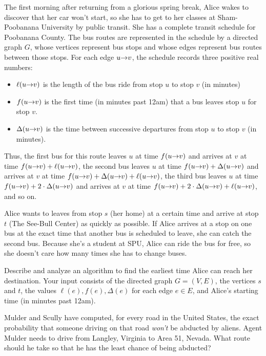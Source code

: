 \begin{exercises}
\item The first morning after returning from a glorious spring break, Alice wakes to discover that her car won’t start, so she has to get to her classes at Sham-Poobanana University by public transit.
She has a complete transit schedule for Poobanana County.
The bus routes are represented in the schedule by a directed graph $G$, whose vertices represent bus stops and whose edges represent bus routes between those stops.
For each edge $u\mathord{\rightarrow}v$, the schedule records three positive real numbers:
\begin{itemize}
\item $\ell(u\mathord{\rightarrow}v)$ is the length of the bus ride from stop $u$ to stop $v$ (in minutes)
\item $f(u\mathord{\rightarrow}v)$ is the first time (in minutes past 12am) that a bus leaves stop $u$ for stop $v$.
\item $\Delta(u\mathord{\rightarrow}v)$ is the time between successive departures from stop $u$ to stop $v$ (in minutes).
\end{itemize}
Thus, the first bus for this route leaves $u$ at time $f(u\mathord{\rightarrow}v)$ and arrives at $v$ at time $f(u\mathord{\rightarrow}v) + \ell(u\mathord{\rightarrow}v)$, the second bus leaves $u$ at time $f(u\mathord{\rightarrow}v) + \Delta(u\mathord{\rightarrow}v)$ and arrives at $v$ at time $f(u\mathord{\rightarrow}v) + \Delta(u\mathord{\rightarrow}v) + \ell(u\mathord{\rightarrow}v)$, the third bus leaves $u$ at time $f(u\mathord{\rightarrow}v) + 2 \cdot \Delta(u\mathord{\rightarrow}v)$ and arrives at $v$ at time $f(u\mathord{\rightarrow}v) + 2 \cdot \Delta(u\mathord{\rightarrow}v) + \ell(u\mathord{\rightarrow}v)$, and so on.

Alice wants to leaves from stop $s$ (her home) at a certain time and arrive at stop $t$ (The See-Bull Center) as quickly as possible.
If Alice arrives at a stop on one bus at the exact time that another bus is scheduled to leave, she can catch the second bus.
Because she’s a student at SPU, Alice can ride the bus for free, so she doesn’t care how many times she has to change buses.

Describe and analyze an algorithm to find the earliest time Alice can reach her destination.
Your input consists of the directed graph $G = (V, E)$, the vertices $s$ and $t$, the values $\ell(e), f(e), \Delta(e)$ for each edge $e \in E$, and Alice’s starting time (in minutes past 12am).

\item Mulder and Scully have computed, for every road in the United States, the exact probability that someone driving on that road \textit{won’t} be abducted by aliens.
Agent Mulder needs to drive from Langley, Virginia to Area 51, Nevada.
What route should he take so that he has the least chance of being abducted?


\end{exercises}

